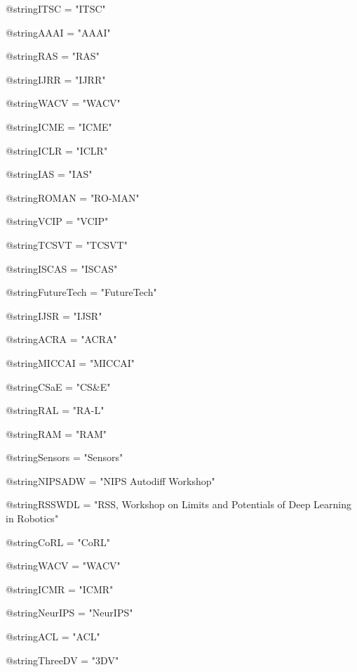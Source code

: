 @string{ITSC = "ITSC"}

@string{AAAI = "AAAI"}

@string{RAS = "RAS"}

@string{IJRR = "IJRR"}

@string{WACV = "WACV"}

@string{ICME = "ICME"}

@string{ICLR = "ICLR"}

@string{IAS = "IAS"}

@string{ROMAN = "RO-MAN"}

@string{VCIP = "VCIP"}

@string{TCSVT = "TCSVT"}

@string{ISCAS = "ISCAS"}

@string{FutureTech = "FutureTech"}

@string{IJSR = "IJSR"}

@string{ACRA = "ACRA"}

@string{MICCAI = "MICCAI"}

@string{CSaE = "CS\&E"}

@string{RAL = "RA-L"}

@string{RAM = "RAM"}

@string{Sensors = "Sensors"}

@string{NIPSADW = "NIPS Autodiff Workshop"}

@string{RSSWDL = "RSS, Workshop on Limits and Potentials of Deep Learning in Robotics"}

@string{CoRL = "CoRL"}

@string{WACV = "WACV"}

@string{ICMR = "ICMR"}

@string{NeurIPS = "NeurIPS"}

@string{ACL = "ACL"}

@string{ThreeDV = "3DV"}